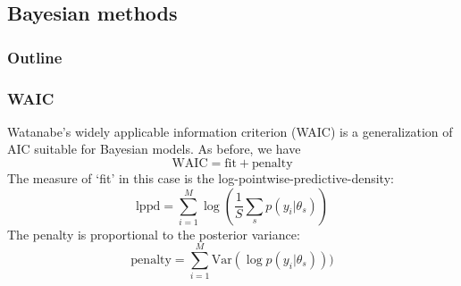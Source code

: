 \documentclass[color=usenames,dvipsnames]{beamer}\usepackage[]{graphicx}\usepackage[]{color}
\begin{document}





\subsection{Bayesian methods}



\begin{frame}
  \frametitle{Outline}
  \Large
\end{frame}



\begin{frame}
  \frametitle{WAIC}
  Watanabe's widely applicable information criterion (WAIC) is a
  generalization of AIC suitable for Bayesian models. %
  \pause
  As before, we have 
  \[
    \mathrm{WAIC} = \mathrm{fit} + \mathrm{penalty}
  \]
  \pause
  \vfill
  The measure of `fit' in this case is the
  log-pointwise-predictive-density:
  \[
     \mathrm{lppd} = \sum_{i=1}^M \log\left(\frac{1}{S} \sum_s p(y_i|\theta_s)\right)
  \]
  \pause
  \vfill
  The penalty is proportional to the posterior variance:
  \[
     \mathrm{penalty} = \sum_{i=1}^M \mathrm{Var}(\log p(y_i|\theta_s)))
  \]
\end{frame}
\end{document}
